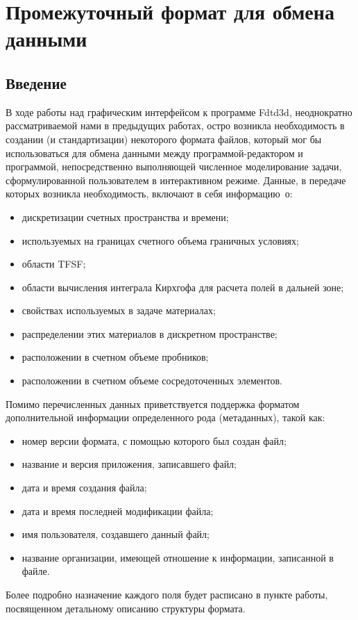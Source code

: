 
\section{Промежуточный формат для обмена данными}

\subsection{Введение}

В ходе работы над графическим интерфейсом к программе Fdtd3d, неоднократно
рассматриваемой нами в предыдущих работах, остро возникла необходимость
в создании (и стандартизации) некоторого формата файлов, который мог бы
использоваться для обмена данными между программой-редактором и программой,
непосредственно выполняющей численное моделирование задачи, сформулированной
пользователем в интерактивном режиме. Данные, в передаче которых возникла
необходимость, включают в себя информацию~о:
\begin{itemize}
\item дискретизации счетных пространства и времени;
\item используемых на границах счетного объема граничных условиях;
\item области TFSF;
\item области вычисления интеграла Кирхгофа для расчета полей в дальней зоне;
\item свойствах используемых в задаче материалах;
\item распределении этих материалов в дискретном пространстве;
\item расположении в счетном объеме пробников;
\item расположении в счетном объеме сосредоточенных элементов.
\end{itemize}

Помимо перечисленных данных приветствуется поддержка форматом дополнительной
информации определенного рода (метаданных), такой как:
\begin{itemize}
\item номер версии формата, с помощью которого был создан файл;
\item название и версия приложения, записавшего файл;
\item дата и время создания файла;
\item дата и время последней модификации файла;
\item имя пользователя, создавшего данный файл;
\item название организации, имеющей отношение к информации, записанной в файле.
\end{itemize}
Более подробно назначение каждого поля будет расписано в пункте работы,
посвященном детальному описанию структуры формата.

